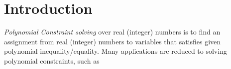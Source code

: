 \documentclass[runningheads,a4paper,oribibl]{llncs}
\begin{document}
%

\section{Introduction}
{\em Polynomial Constraint solving} over real (integer) numbers is to find an assignment from real (integer) numbers to variables 
that satisfies given polynomial inequality/equality. 
%
Many applications are reduced to solving polynomial constraints, such as 
\end{document}
